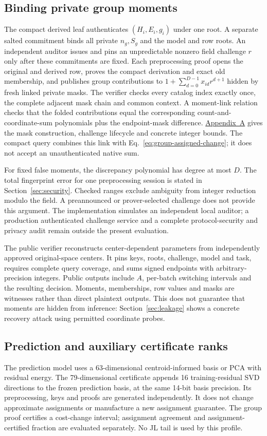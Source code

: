\subsection{Binding private group moments}
The compact derived leaf authenticates $(H_i,E_i,g_i)$ under one root. A
separate salted commitment binds all private $n_g,S_g$ and the model and row
roots. An independent auditor issues and pins an unpredictable nonzero field
challenge $r$ only after these commitments are fixed. Each preprocessing proof
opens the original and derived row, proves the compact derivation and exact
old membership, and publishes group contributions to
$1+\sum_{d=0}^{D-1}x_{id}r^{d+1}$ hidden by fresh linked private masks. The
verifier checks every catalog index exactly once, the complete adjacent mask
chain and common context. A moment-link relation checks that the folded
contributions equal the corresponding count-and-coordinate-sum polynomials
plus the endpoint-mask difference. \hyperref[sec:protocol-spec]{Appendix~A} gives the
mask construction, challenge lifecycle and concrete integer bounds.
The compact query combines this link with
Eq.~\eqref{eq:group-assigned-change}; it does not accept an unauthenticated
native sum.

For fixed false moments, the discrepancy polynomial has degree at most $D$.
The total fingerprint error for one preprocessing session is stated in
Section~\ref{sec:security}. Checked ranges exclude ambiguity from integer reduction modulo
the field. A preannounced or prover-selected challenge does not provide this
argument. The implementation simulates an independent local auditor; a
production authenticated challenge service and a complete protocol-security
and privacy audit remain outside the present evaluation.

The public verifier reconstructs center-dependent parameters from independently
approved original-space centers. It pins keys, roots, challenge, model and task,
requires complete query coverage, and sums signed endpoints with
arbitrary-precision integers. Public outputs include $A$, per-batch switching
intervals and the resulting decision. Moments, memberships, row values and
masks are witnesses rather than direct plaintext outputs. This does not
guarantee that moments are hidden from inference: Section~\ref{sec:leakage}
shows a concrete recovery attack using permitted coordinate probes.

\subsection{Prediction and auxiliary certificate ranks}
The prediction model uses a 63-dimensional centroid-informed basis or PCA with
residual energy. The 79-dimensional certificate appends 16 training-residual
SVD directions to the frozen prediction basis, at the same 14-bit basis
precision. Its preprocessing, keys and proofs are generated independently.
It does not change approximate assignments or manufacture a new assignment
guarantee. The group proof
certifies a cost-change interval; assignment agreement and assignment-certified
fraction are evaluated separately. No JL tail is used by this profile.

